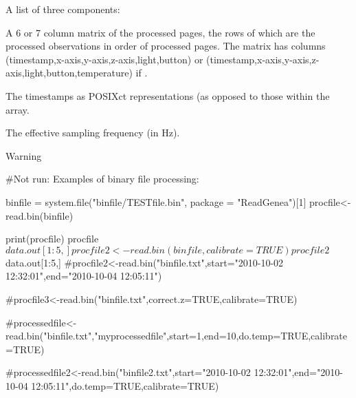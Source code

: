 \documentclass[a4paper]{book}
\begin{document}
%
\begin{Value}
A list of three components:
\begin{ldescription}
\item[\code{data.out}] A 6 or 7 column matrix of the processed pages, the rows of which are the processed observations in order of processed pages.  The matrix has columns (timestamp,x-axis,y-axis,z-axis,light,button) or (timestamp,x-axis,y-axis,z-axis,light,button,temperature) if .
\item[\code{page.timestamps}] The timestamps as POSIXct representations (as opposed to those within the  array.
\item[\code{freq}] The effective sampling frequency (in Hz).
\end{ldescription}
\end{Value}
%
\begin{Section}{Warning}
\end{Section}
%
\begin{SeeAlso}\relax
{} 
\end{SeeAlso}
%
\begin{Examples}
\begin{ExampleCode}

#Not run: Examples of binary file processing:

binfile  = system.file("binfile/TESTfile.bin", package = "ReadGenea")[1]
procfile<-read.bin(binfile)

print(procfile)
procfile$data.out[1:5,]

procfile2<-read.bin(binfile, calibrate = TRUE)
procfile2$data.out[1:5,]
#procfile2<-read.bin("binfile.txt",start="2010-10-02 12:32:01",end="2010-10-04 12:05:11")

#procfile3<-read.bin("binfile.txt",correct.z=TRUE,calibrate=TRUE)

#processedfile<-read.bin("binfile.txt","myprocessedfile",start=1,end=10,do.temp=TRUE,calibrate=TRUE)

#processedfile2<-read.bin("binfile2.txt",start="2010-10-02 12:32:01",end="2010-10-04 12:05:11",do.temp=TRUE,calibrate=TRUE)
\end{ExampleCode}
\end{Examples}
\end{document}
